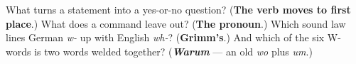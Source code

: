 \begin{tcolorbox}[breakable,colback=teal!4,colframe=teal!35!black,title={Before you move on}]
What turns a statement into a yes-or-no question? (\textbf{The verb moves to first place}.) What does a command leave out? (\textbf{The pronoun}.) Which sound law lines German \emph{w-} up with English \emph{wh-}? (\textbf{Grimm's}.) And which of the six W-words is two words welded together? (\emph{\textbf{Warum}} — an old \emph{wo} plus \emph{um}.)
\end{tcolorbox}
